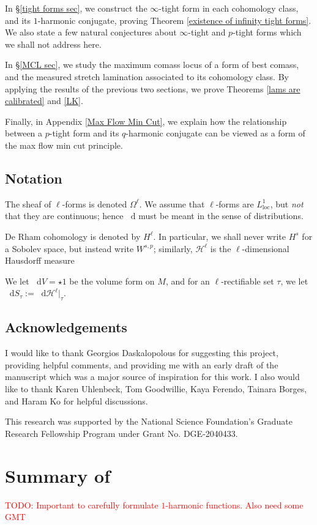 \documentclass[reqno,11pt]{amsart}
\newcommand*\dif{\mathop{}\!\mathrm{d}}
\newcommand{\loc}{\mathrm{loc}}
\theoremstyle{definition}
\numberwithin{equation}{section}
\newcommand\todo[1]{\textcolor{red}{TODO: #1}}
\begin{document}
In \S\ref{tight forms sec}, we construct the $\infty$-tight form in each cohomology class, and its $1$-harmonic conjugate, proving Theorem \ref{existence of infinity tight forms}.
We also state a few natural conjectures about $\infty$-tight and $p$-tight forms which we shall not address here.

In \S\ref{MCL sec}, we study the maximum comass locus of a form of best comass, and the measured stretch lamination associated to its cohomology class.
By applying the results of the previous two sections, we prove Theorems \ref{lams are calibrated} and \ref{LK}.

Finally, in Appendix \ref{Max Flow Min Cut}, we explain how the relationship between a $p$-tight form and its $q$-harmonic conjugate can be viewed as a form of the max flow min cut principle.

\subsection{Notation}
The sheaf of $\ell$-forms is denoted $\Omega^\ell$.
We assume that $\ell$-forms are $L^1_\loc$, but \emph{not} that they are continuous; hence $\dif$ must be meant in the sense of distributions.

De Rham cohomology is denoted by $H^\ell$.
In particular, we shall never write $H^s$ for a Sobolev space, but instead write $W^{s, p}$; similarly, $\mathcal H^\ell$ is the $\ell$-dimensional Hausdorff measure

We let $\dif V = \star 1$ be the volume form on $M$, and for an $\ell$-rectifiable set $\tau$, we let $\dif S_\tau := \dif \mathcal H^\ell|_\tau$.

\subsection{Acknowledgements}
I would like to thank Georgios Daskalopolous for suggesting this project, providing helpful comments, and providing me with an early draft of the manuscript \cite{daskalopoulos2023} which was a major source of inspiration for this work.
I also would like to thank Karen Uhlenbeck, Tom Goodwillie, Kaya Ferendo, Tainara Borges, and Haram Ko for helpful discussions.

This research was supported by the National Science Foundation's Graduate Research Fellowship Program under Grant No. DGE-2040433.


\section{Summary of \texorpdfstring{\cite{BackusFLG,BackusCML}}{previous results}}
\todo{Important to carefully formulate $1$-harmonic functions. Also need some GMT}
\end{document}
